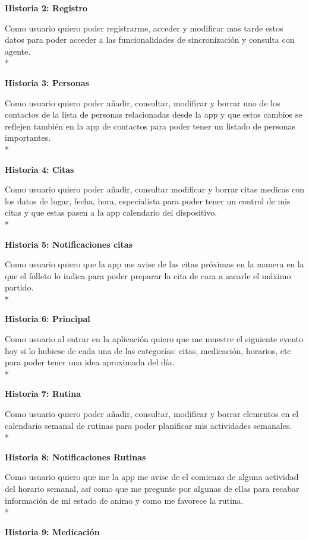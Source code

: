 \documentclass[../pfc.tex]{subfiles}
\begin{document}
		
	\textbf{Historia 2: Registro}
		
		Como usuario quiero poder registrarme, acceder y modificar mas tarde estos datos para poder acceder a las funcionalidades de sincronización y consulta con agente.\\*
	
	
	\textbf{Historia 3: Personas}
		
		Como usuario quiero poder añadir, consultar, modificar y borrar uno de los contactos de la lista de personas relacionadas desde la app y que estos cambios se reflejen también en la app de contactos para poder tener un listado de personas importantes.\\*


	\textbf{Historia 4: Citas}	
	
		Como usuario quiero poder añadir, consultar modificar y borrar citas medicas con los datos de lugar, fecha, hora, especialista para poder tener un control de mis citas y que estas pasen a la app calendario del dispositivo. \\*
		
		
	\textbf{Historia 5: Notificaciones citas}
		
		Como usuario quiero que la app me avise de las citas próximas en la manera en la que el folleto lo indica para poder preparar la cita de cara a sacarle el máximo partido.\\*
	
	
	\textbf{Historia 6: Principal}
	
		Como usuario al entrar en la aplicación quiero que me muestre el siguiente evento hoy si lo hubiese de cada una de las categorías: citas, medicación, horarios, etc para poder tener una idea aproximada del día.\\*
	
	
	\textbf{Historia 7: Rutina}
	
		Como usuario quiero poder añadir, consultar, modificar y borrar elementos en el calendario semanal de rutinas para poder planificar mis actividades semanales.\\*
	
	
	\textbf{Historia 8: Notificaciones Rutinas}
	
		Como usuario quiero que me la app me avise de el comienzo de alguna actividad del horario semanal, así como que me pregunte por algunas de ellas para recabar información de mi estado de animo y como me favorece la rutina. \\*
	
	
	\textbf{Historia 9: Medicación}
	
\end{document}
